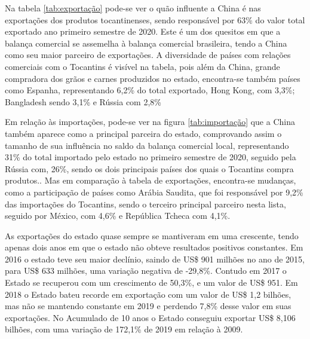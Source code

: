 \par Na tabela \ref{tab:exportação} pode-se ver o quão influente a China é nas exportações dos produtos tocantinenses, sendo responsável por 63\% do valor total exportado ano primeiro semestre de 2020. Este é um dos quesitos em que a balança comercial se assemelha à balança comercial brasileira, tendo a China como seu maior parceiro de exportações. A diversidade de países com relações comerciais com o Tocantins é visível na tabela, pois além da China, grande compradora dos grãos e carnes produzidos no estado, encontra-se também países como Espanha, representando 6,2\% do total exportado, Hong Kong, com 3,3\%; Bangladesh sendo 3,1\% e Rússia com 2,8\%


\par Em relação às importações, pode-se ver na figura \ref{tab:importação} que a China também aparece como a principal parceira do estado, comprovando assim o tamanho de sua influência no saldo da balança comercial local, representando 31\% do total importado pelo estado no primeiro semestre de 2020, seguido pela Rússia com, 26\%, sendo os dois principais países dos quais o Tocantins compra produtos.. Mas em comparação à tabela de exportações, encontra-se mudanças, como a participação de países como Arábia Saudita, que foi responsável por 9,2\% das importações do Tocantins, sendo o terceiro principal parceiro nesta lista, seguido por México, com 4,6\% e República Tcheca com 4,1\%.



\par As exportações do estado quase sempre se mantiveram em uma crescente, tendo apenas dois anos em que o estado não obteve resultados positivos constantes. Em 2016 o estado teve seu maior declínio, saindo de US\$ 901 milhões no ano de 2015, para US\$ 633 milhões, uma variação negativa de -29,8\%. Contudo em 2017 o Estado se recuperou com um crescimento de 50,3\%, e um valor de US\$ 951. Em 2018 o Estado bateu recorde em exportação com um valor de US\$ 1,2 bilhões, mas não se mantendo constante em 2019 e perdendo 7,8\% desse valor em suas exportações. No Acumulado de 10 anos o Estado conseguiu exportar US\$ 8,106 bilhões, com uma variação de 172,1\% de 2019 em relação à 2009.

